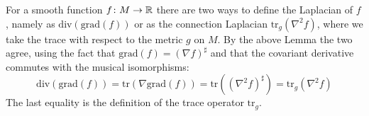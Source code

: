 \begin{remark}
    For a smooth function $f \colon M \to \mathbb{R}$ there are two ways to define the Laplacian of $f$, namely as $\mathrm{div}(\mathrm{grad}(f))$ or as the connection Laplacian $\mathrm{tr}_g(\nabla^2 f)$, where we take the trace with respect to the metric $g$ on $M$. By the above Lemma the two agree, using the fact that $\mathrm{grad}(f) = (\nabla f)^\sharp$ and that the covariant derivative commutes with the musical isomorphisms:
    \[
    \mathrm{div}(\mathrm{grad}(f)) = \mathrm{tr}(\nabla\mathrm{grad}(f)) = \mathrm{tr}((\nabla^2f)^\sharp) = \mathrm{tr}_g(\nabla^2 f)
    \]
    The last equality is the definition of the trace operator $\mathrm{tr}_g$.
\end{remark}